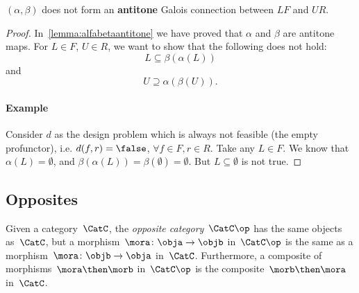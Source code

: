 

\begin{lemma}
    $(\alpha, \beta)$ does not form an \textbf{antitone} Galois connection between $LF$ and $UR$.
\end{lemma}
\begin{proof}
    In~\cref{lemma:alfabetaantitone} we have proved that $\alpha$ and $\beta$ are antitone maps. For $L\in F$, $U\in R$, we want to show that the following does not hold:
    \begin{equation}
        \label{eq:alfabetafirst}
        L\subseteq \beta(\alpha(L))
    \end{equation}
    and
    \begin{equation}
        \label{eq:alfabetasec}
        U\supseteq \alpha(\beta(U)).
    \end{equation}

    \paragraph{Example} Consider $d$ as the design problem which is always not feasible (the empty profunctor), i.e. $d(f,r)=\false$, $\forall f\in F,r\in R$. Take any $L\in F$. We know that $\alpha(L)=\emptyset$, and $\beta(\alpha(L))=\beta(\emptyset)=\emptyset$. But $L\subseteq \emptyset$ is not true.

\end{proof}

\subsection{Opposites}

\begin{ctdefinition}
    \label{def:oppositecat}
    Given a category~$\CatC$, the \emph{opposite category}~$\CatC\op$ has the same objects as~$\CatC$, but a morphism~$\mora\colon \obja\to \objb$ in~$\CatC\op$ is the same as a morphism~$\mora\colon \objb\to \obja$ in~$\CatC$. Furthermore, a composite of morphisms~$\mora \then \morb$ in~$\CatC\op$ is the composite~$\morb\then \mora$ in~$\CatC$.
\end{ctdefinition}


